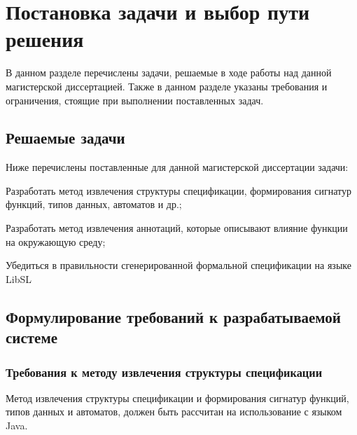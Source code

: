 \chapter{Постановка задачи и выбор пути решения}

В данном разделе перечислены задачи, решаемые в ходе работы над данной магистерской диссертацией. Также в данном разделе указаны требования и ограничения, стоящие при выполнении поставленных задач.

\section{Решаемые задачи}

Ниже перечислены поставленные для данной магистерской диссертации задачи:
%
\begin{itemize*}
\item Разработать метод извлечения структуры спецификации, формирования сигнатур функций, типов данных, автоматов и др.;
\item Разработать метод извлечения аннотаций, которые описывают влияние функции на окружающую среду;
\item Убедиться в правильности сгенерированной формальной спецификации на языке LibSL
\end{itemize*}
%

\section{Формулирование требований к разрабатываемой системе}

\subsection{Требования к методу извлечения структуры спецификации}

Метод извлечения структуры спецификации и формирования сигнатур функций, типов данных и автоматов, должен быть рассчитан на использование с языком Java.

